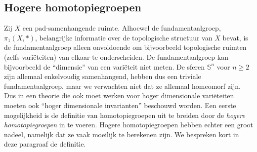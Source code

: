 \documentclass[12pt]{book}
\begin{document}
\subsection{Hogere homotopiegroepen}

Zij $X$ een pad-samenhangende ruimte. Alhoewel de fundamentaalgroep, $\pi_{1}(X,*)$, belang\-rijke
informatie over de topologische structuur van $X$ bevat, is de fundamentaalgroep alleen onvoldoende
om bijvoorbeeld topologische ruimten (zelfs vari\"eteiten) van elkaar te onderscheiden. De
fundamentaalgroep kan bijvoorbeeld de ``dimensie'' van  een vari\"eteit niet meten. De sferen
$\mathbb{S}^{n}$ voor $n\geq 2$ zijn allemaal enkelvoudig samenhangend, hebben dus een triviale
fundamentaalgroep, maar we verwachten niet dat ze allemaal homeomorf zijn. Dus in een theorie die
ook moet werken voor  hoger dimensionale vari\"eteiten moeten ook ``hoger dimensionale
invarianten'' beschouwd worden. Een eerste mogelijkheid is de definitie van homotopiegroepen uit te
breiden door de  {\em hogere homotopiegroepen} in te voer\-en. Hogere homotopiegroepen hebben echter een groot nadeel, namelijk dat ze vaak moeilijk
te berekenen zijn. We bespreken kort in deze paragraaf
de definitie. 
\end{document}
